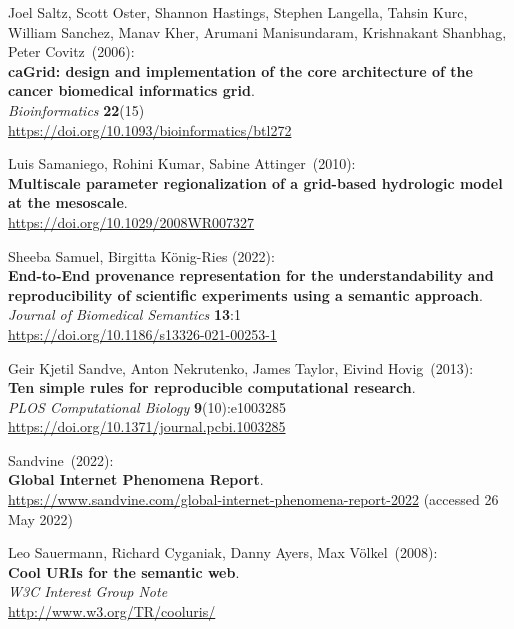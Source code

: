 \begin{thebibliography}{9}
Joel Saltz, Scott Oster, Shannon Hastings, Stephen Langella,
Tahsin Kurc, William Sanchez, Manav Kher, Arumani Manisundaram,
Krishnakant Shanbhag, Peter Covitz~(2006): \\
\textbf{caGrid: design and implementation of the core architecture of
the cancer biomedical informatics grid}.\\
\emph{Bioinformatics}
\textbf{22}(15) \\
\url{https://doi.org/10.1093/bioinformatics/btl272}

Luis Samaniego, Rohini Kumar, Sabine Attinger~(2010): \\
\textbf{Multiscale parameter regionalization of a grid-based hydrologic model at the mesoscale}.\\
\url{https://doi.org/10.1029/2008WR007327}

 Sheeba Samuel, Birgitta König-Ries (2022): \\
\textbf{End-to-End provenance representation for the understandability and reproducibility of scientific experiments using a semantic approach}. \\
\emph{Journal of Biomedical Semantics} \textbf{13}:1 \\
\url{https://doi.org/10.1186/s13326-021-00253-1}

Geir Kjetil Sandve, Anton Nekrutenko, James Taylor, Eivind Hovig~(2013): \\
\textbf{Ten simple rules for reproducible computational research}.\\
\emph{PLOS Computational Biology} \textbf{9}(10):e1003285\\
\url{https://doi.org/10.1371/journal.pcbi.1003285}

Sandvine~(2022): \\
\textbf{Global Internet Phenomena Report}.\\
\url{https://www.sandvine.com/global-internet-phenomena-report-2022}
(accessed 26 May 2022)

Leo Sauermann, Richard Cyganiak, Danny Ayers, Max Völkel~(2008): \\
\textbf{Cool URIs for the semantic web}.\\
\emph{W3C Interest Group Note}\\
\url{http://www.w3.org/TR/cooluris/}


\end{thebibliography}
